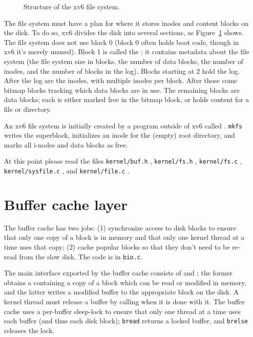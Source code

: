 \begin{figure}[t]
\center

\caption{Structure of the xv6 file system. }
\label{fig:fslayout}
\end{figure}

The file system must have a plan for where it stores inodes and
content blocks on the disk.
To do so, xv6 divides the disk into several
sections, as 
Figure~\ref{fig:fslayout} shows.
The file system does not use
block 0 (block 0 often holds boot code, though in xv6 it's
merely unused).
Block 1 is called the 
; 
it contains metadata about the file system (the file system size in blocks, the
number of data blocks, the number of inodes, and the number of blocks in the
log).  Blocks starting at 2 hold the log.  After the log are the inodes, with multiple inodes per block.  After
those come bitmap blocks tracking which data blocks are in use.
The remaining blocks are data blocks; each is either marked
free in the bitmap block, or holds content for a file or directory.

An xv6 file system is initially created by a program outside
of xv6 called 
.
{\tt mkfs} writes the superblock, initializes an inode for
the (empty) root directory, and marks all i-nodes and data
blocks as free.

At this point please read the files \lstinline{kernel/buf.h}
, \lstinline{kernel/fs.h} ,
\lstinline{kernel/fs.c} ,
\lstinline{kernel/sysfile.c} , and
\lstinline{kernel/file.c} .


\section{Buffer cache layer}
\label{s:bcache}

The buffer cache has two jobs: (1) synchronize access to disk blocks to ensure
that only one copy of a block is in memory and that only one kernel thread at a time
uses that copy; (2) cache popular blocks so that they don't need to be re-read from
the slow disk. The code is in
\lstinline{bio.c}.

The main interface exported by the buffer cache consists of
and
;
the former obtains a
containing a copy of a block which can be read or modified in memory, and the
latter writes a modified buffer to the appropriate block on the disk.
A kernel thread must release a buffer by calling
when it is done with it.
The buffer cache uses a per-buffer sleep-lock to ensure
that only one thread at a time uses each buffer
(and thus each disk block);
\lstinline{bread}
returns a locked buffer, and
\lstinline{brelse}
releases the lock.

